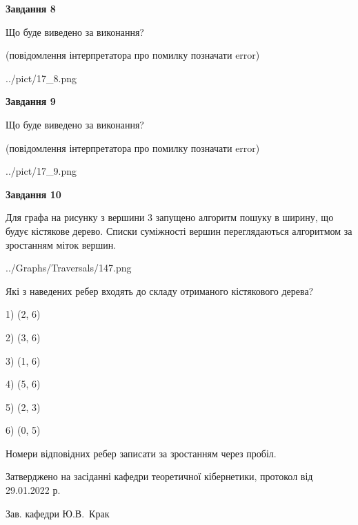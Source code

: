 \documentclass[12pt, ukrainian]{article}
\begin{document}
{\begin {large}
{\begin {center}\textbf{Завдання 8}\end {center}}\par
Що буде виведено за виконання?\par
 (повідомлення інтерпретатора про помилку позначати error)
\begin{center}
	{../pict/17_8.png}
\end{center}
\newpage

{\begin {center}\textbf{Завдання 9}\end {center}}\par
Що буде виведено за виконання?\par
 (повідомлення інтерпретатора про помилку позначати error)\par
\begin{center}
	{../pict/17_9.png}
\end{center}
\newpage

{\begin {center}\textbf{Завдання 10}\end {center}}\par
Для графа на рисунку з вершини 3 запущено алгоритм пошуку в ширину, що будує кістякове дерево. Списки суміжності вершин переглядаються алгоритмом за зростанням міток вершин.\par
\begin{center}
	{../Graphs/Traversals/147.png}
\end{center}
\par Які з наведених ребер входять до складу отриманого кістякового дерева?\par
1) (2, 6)\par
2) (3, 6)\par
3) (1, 6)\par
4) (5, 6)\par
5) (2, 3)\par
6) (0, 5)\par
{\vskip 15pt} Номери відповідних ребер записати за зростанням через пробіл.\par
\newpage


\end {large}
}
{\smallskip \begin {small} Затверджено на засіданні кафедри теоретичної кібернетики, протокол  від   29.01.2022 р.\par\smallskip\smallskip
{\parbox {6.5 cm}{Зав. кафедри \dotfill Ю.В.~Крак}} \end{small}}
\end{document}
